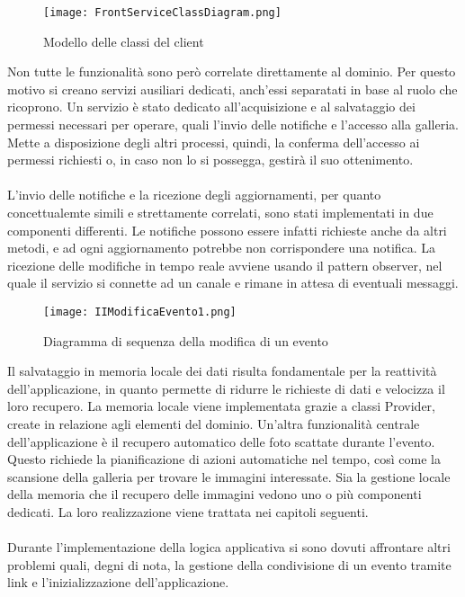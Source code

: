 \clearpage 

\begin{figure}[h!]
    \begin{center}
        \texttt{[image: FrontServiceClassDiagram.png]}
        \caption{Modello delle classi del client}
    \end{center}
\end{figure}

Non tutte le funzionalità sono però correlate direttamente al dominio.
Per questo motivo si creano servizi ausiliari dedicati, 
anch'essi separatati in base al ruolo che ricoprono.
\clearpage
Un servizio è stato dedicato all'acquisizione e al salvataggio dei permessi necessari per operare, 
quali l'invio delle notifiche e l'accesso alla galleria. 
Mette a disposizione degli altri processi, quindi, la conferma dell'accesso ai permessi richiesti o, 
in caso non lo si possegga, gestirà il suo ottenimento.\\ 
\\
L'invio delle notifiche e la ricezione degli aggiornamenti, 
per quanto concettualemte simili e strettamente correlati,
sono stati implementati in due componenti differenti. 
Le notifiche possono essere infatti richieste anche da altri metodi, 
e ad ogni aggiornamento potrebbe non corrispondere una notifica.
La ricezione delle modifiche in tempo reale avviene usando il pattern observer, 
nel quale il servizio si connette ad un canale e rimane in attesa di eventuali messaggi.

\begin{figure}[h!]
    \begin{center}
        \texttt{[image: IIModificaEvento1.png]}
        \caption{Diagramma di sequenza della modifica di un evento}
    \end{center}
\end{figure}

\clearpage

Il salvataggio in memoria locale dei dati risulta fondamentale per la reattività dell'applicazione,
in quanto permette di ridurre le richieste di dati e velocizza il loro recupero.
La memoria locale viene implementata grazie a classi Provider, create in relazione agli elementi del dominio.
Un'altra funzionalità centrale dell'applicazione è il recupero automatico 
delle foto scattate durante l'evento. 
Questo richiede la pianificazione di azioni automatiche nel tempo,
così come la scansione della galleria per trovare le immagini interessate.
Sia la gestione locale della memoria che il recupero delle immagini vedono uno o più componenti dedicati.
La loro realizzazione viene trattata nei capitoli seguenti.\\
\\
Durante l'implementazione della logica applicativa si sono dovuti affrontare altri problemi quali, degni di nota, 
la gestione della condivisione di un evento tramite link e l'inizializzazione dell'applicazione.\\

